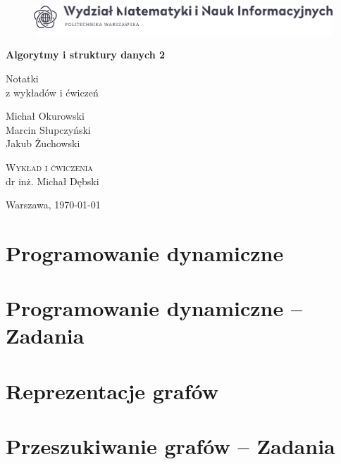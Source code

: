 



\begin{titlepage}
	\begin{center}
		\begin{figure}[h!]
			\centering
			\includegraphics[width=\textwidth]{data/logo.png}
		\end{figure}
		
		\vspace*{3cm}
		\Huge\textbf{Algorytmy i struktury danych 2}
		
		\vspace{1cm}
		\LARGE Notatki \\ \Large z wykładów i ćwiczeń 
		
		\vspace{4cm}
		\Large Michał Okurowski \\
		Marcin Słupczyński \\
		Jakub Żuchowski
		
		\vspace{3.5cm}	
		\normalsize\textsc{Wykład i ćwiczenia}\\ dr inż. Michał Dębski
		
		\vfill	
		\normalsize
		Warszawa, \today
		
	\end{center}
\end{titlepage}


\tableofcontents
\pagebreak

\section{Programowanie dynamiczne}

\section{Programowanie dynamiczne -- Zadania}

\section{Reprezentacje grafów}

\section{Przeszukiwanie grafów -- Zadania}

